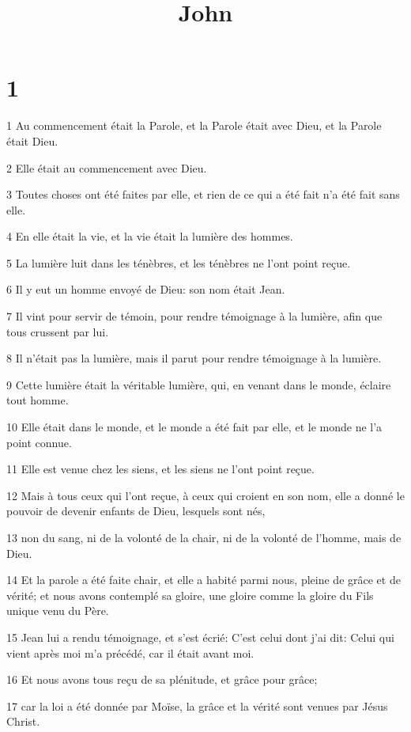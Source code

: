 

\title{John}


\chapter{1}

\par 1 Au commencement était la Parole, et la Parole était avec Dieu, et la Parole était Dieu.
\par 2 Elle était au commencement avec Dieu.
\par 3 Toutes choses ont été faites par elle, et rien de ce qui a été fait n'a été fait sans elle.
\par 4 En elle était la vie, et la vie était la lumière des hommes.
\par 5 La lumière luit dans les ténèbres, et les ténèbres ne l'ont point reçue.
\par 6 Il y eut un homme envoyé de Dieu: son nom était Jean.
\par 7 Il vint pour servir de témoin, pour rendre témoignage à la lumière, afin que tous crussent par lui.
\par 8 Il n'était pas la lumière, mais il parut pour rendre témoignage à la lumière.
\par 9 Cette lumière était la véritable lumière, qui, en venant dans le monde, éclaire tout homme.
\par 10 Elle était dans le monde, et le monde a été fait par elle, et le monde ne l'a point connue.
\par 11 Elle est venue chez les siens, et les siens ne l'ont point reçue.
\par 12 Mais à tous ceux qui l'ont reçue, à ceux qui croient en son nom, elle a donné le pouvoir de devenir enfants de Dieu, lesquels sont nés,
\par 13 non du sang, ni de la volonté de la chair, ni de la volonté de l'homme, mais de Dieu.
\par 14 Et la parole a été faite chair, et elle a habité parmi nous, pleine de grâce et de vérité; et nous avons contemplé sa gloire, une gloire comme la gloire du Fils unique venu du Père.
\par 15 Jean lui a rendu témoignage, et s'est écrié: C'est celui dont j'ai dit: Celui qui vient après moi m'a précédé, car il était avant moi.
\par 16 Et nous avons tous reçu de sa plénitude, et grâce pour grâce;
\par 17 car la loi a été donnée par Moïse, la grâce et la vérité sont venues par Jésus Christ.
